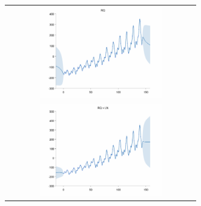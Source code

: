 \documentclass[twoside]{article}
\begin{document}
\begin{figure}[h!]
\centering
\newcommand{\wag}{8cm}  %
\newcommand{\hag}{4cm}  %
\begin{tabular}{c}
 \includegraphics[width=\wag,height=\hag]{../figures/decomposition/01-airline-months_max_level_0/01-airline-months_all} \\ 
 \includegraphics[width=\wag,height=\hag]{../figures/decomposition/01-airline-months_max_level_1/01-airline-months_all} \\

\end{tabular}
\end{figure}
\end{document}
